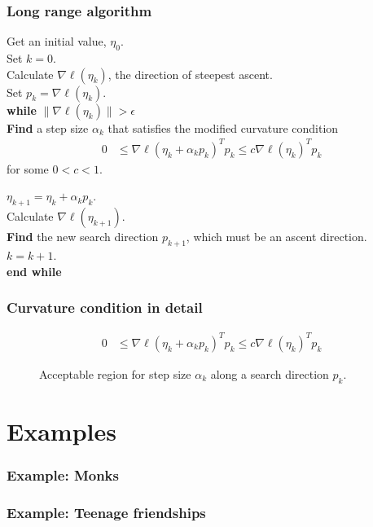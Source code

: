 \documentclass[compress, 9pt]{beamer}
\begin{document}
\frame
{
\frametitle{Long range algorithm}
\begin{singlespace} 
{
\noindent Get an initial value, $\eta_0$.\\ 
Set $k=0$. \\
Calculate $\nabla \ell( \eta_k)$, the direction of steepest ascent. \\
Set $p_k = \nabla \ell( \eta_k)$. \\
\textbf{while}  $\lVert \nabla \ell( \eta_k) \rVert > \epsilon$ \\ 
\hspace{4mm} \indent	 
\textbf{Find} a step size $\alpha_k$ that satisfies the modified 
curvature condition
\begin{align*}
	 0 & \leq \nabla \ell( \eta_k + \alpha_k p_k)^T p_k \leq c \nabla \ell(\eta_k)^T 
p_k
\end{align*}
\indent for some $0 < c < 1$.  

$\eta_{k+1} = \eta_k + \alpha_k p_k$.\\
\indent Calculate $\nabla \ell( \eta_{k+1})$.\\
\indent \textbf{Find} the new search direction $p_{k+1}$, which must be an ascent 
direction. \\
\indent $k = k + 1$.  \\
\textbf{end while}\\
}
\end{singlespace}
}

\frame
{
  \frametitle{Curvature condition in detail}
\begin{align*}
	 0 & \leq \nabla \ell( \eta_k + \alpha_k p_k)^T p_k \leq c \nabla \ell(\eta_k)^T 
p_k
\end{align*}
\begin{figure}[h]
\centering
    \scalebox{.25}{}
	\caption{Acceptable region for step size $\alpha_k$ along a search direction $p_k$.}
\label{F:alpha_region}
\end{figure}
}

\section{Examples}
\frame
{
  \frametitle{Example: Monks}  
}

\frame
{
  \frametitle{Example: Teenage friendships}  
}
\end{document}

